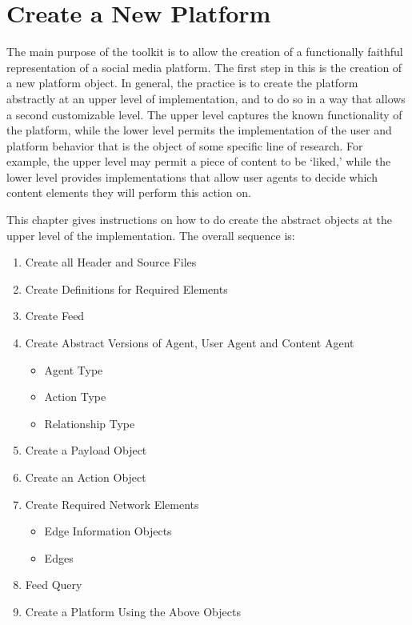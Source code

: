 
\chapter{Create a New Platform} \label{chap:CreateANewPlatform}

\par The main purpose of the \rhpc toolkit is to allow the creation of a functionally faithful representation of a social media platform. The first step in this is the creation of a new platform object. In general, the practice is to create the platform abstractly at an upper level of implementation, and to do so in a way that allows a second customizable level. The upper level captures the known functionality of the platform, while the lower level permits the implementation of the user and platform behavior that is the object of some specific line of research. For example, the upper level may permit a piece of content to be `liked,' while the lower level provides implementations that allow user agents to decide which content elements they will perform this action on.

This chapter gives instructions on how to do create the abstract objects at the upper level of the implementation. The overall sequence is:

\begin{enumerate}
	\item Create all Header and Source Files
	\item Create Definitions for Required Elements
	\item Create Feed 
	\item Create Abstract Versions of Agent, User Agent and Content Agent
		\begin{itemize} \item Agent Type \item Action Type \item Relationship Type \end{itemize}
	\item Create a Payload Object
	\item Create an Action Object
	\item Create Required Network Elements
	\begin{itemize} \item Edge Information Objects \item Edges \end{itemize}
	\item Feed Query
	\item Create a Platform Using the Above Objects
\end{enumerate}

